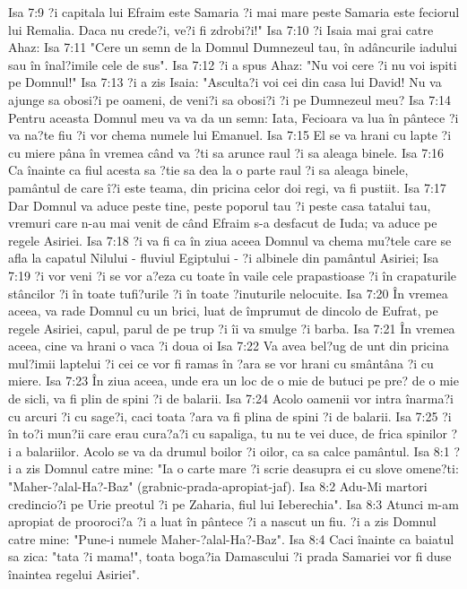 Isa 7:9  ?i capitala lui Efraim este Samaria ?i mai mare peste Samaria este feciorul lui Remalia. Daca nu crede?i, ve?i fi zdrobi?i!"
Isa 7:10  ?i Isaia mai grai catre Ahaz:
Isa 7:11  "Cere un semn de la Domnul Dumnezeul tau, în adâncurile iadului sau în înal?imile cele de sus".
Isa 7:12  ?i a spus Ahaz: "Nu voi cere ?i nu voi ispiti pe Domnul!"
Isa 7:13  ?i a zis Isaia: "Asculta?i voi cei din casa lui David! Nu va ajunge sa obosi?i pe oameni, de veni?i sa obosi?i ?i pe Dumnezeul meu?
Isa 7:14  Pentru aceasta Domnul meu va va da un semn: Iata, Fecioara va lua în pântece ?i va na?te fiu ?i vor chema numele lui Emanuel.
Isa 7:15  El se va hrani cu lapte ?i cu miere pâna în vremea când va ?ti sa arunce raul ?i sa aleaga binele.
Isa 7:16  Ca înainte ca fiul acesta sa ?tie sa dea la o parte raul ?i sa aleaga binele, pamântul de care î?i este teama, din pricina celor doi regi, va fi pustiit.
Isa 7:17  Dar Domnul va aduce peste tine, peste poporul tau ?i peste casa tatalui tau, vremuri care n-au mai venit de când Efraim s-a desfacut de Iuda; va aduce pe regele Asiriei.
Isa 7:18  ?i va fi ca în ziua aceea Domnul va chema mu?tele care se afla la capatul Nilului - fluviul Egiptului - ?i albinele din pamântul Asiriei;
Isa 7:19  ?i vor veni ?i se vor a?eza cu toate în vaile cele prapastioase ?i în crapaturile stâncilor ?i în toate tufi?urile ?i în toate ?inuturile nelocuite.
Isa 7:20  În vremea aceea, va rade Domnul cu un brici, luat de împrumut de dincolo de Eufrat, pe regele Asiriei, capul, parul de pe trup ?i îi va smulge ?i barba.
Isa 7:21  În vremea aceea, cine va hrani o vaca ?i doua oi
Isa 7:22  Va avea bel?ug de unt din pricina mul?imii laptelui ?i cei ce vor fi ramas în ?ara se vor hrani cu smântâna ?i cu miere.
Isa 7:23  În ziua aceea, unde era un loc de o mie de butuci pe pre? de o mie de sicli, va fi plin de spini ?i de balarii.
Isa 7:24  Acolo oamenii vor intra înarma?i cu arcuri ?i cu sage?i, caci toata ?ara va fi plina de spini ?i de balarii.
Isa 7:25  ?i în to?i mun?ii care erau cura?a?i cu sapaliga, tu nu te vei duce, de frica spinilor ?i a balariilor. Acolo se va da drumul boilor ?i oilor, ca sa calce pamântul.
Isa 8:1  ?i a zis Domnul catre mine: "Ia o carte mare ?i scrie deasupra ei cu slove omene?ti: "Maher-?alal-Ha?-Baz" (grabnic-prada-apropiat-jaf).
Isa 8:2  Adu-Mi martori credincio?i pe Urie preotul ?i pe Zaharia, fiul lui Ieberechia".
Isa 8:3  Atunci m-am apropiat de prooroci?a ?i a luat în pântece ?i a nascut un fiu. ?i a zis Domnul catre mine: "Pune-i numele Maher-?alal-Ha?-Baz".
Isa 8:4  Caci înainte ca baiatul sa zica: "tata ?i mama!", toata boga?ia Damascului ?i prada Samariei vor fi duse înaintea regelui Asiriei".
